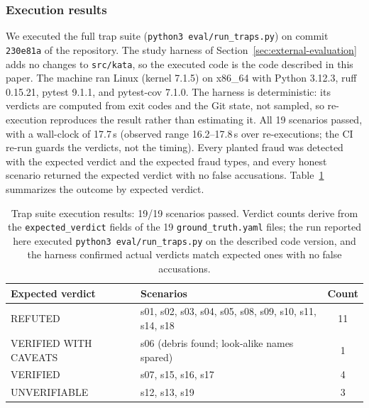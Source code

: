 \documentclass[11pt]{article}
\begin{document}
\subsubsection{Execution results}

We executed the full trap suite (\texttt{python3 eval/run\_traps.py}) on
commit \texttt{230e81a} of the repository. The study harness of
Section~\ref{sec:external-evaluation} adds no changes to \texttt{src/kata},
so the executed code is the code described in this paper. The machine ran
Linux (kernel 7.1.5) on x86\_64 with Python 3.12.3, ruff 0.15.21, pytest 9.1.1, and
pytest-cov 7.1.0. The harness is deterministic: its verdicts are computed
from exit codes and the Git state, not sampled, so re-execution reproduces
the result rather than estimating it. All 19 scenarios passed, with a
wall-clock of 17.7\,s (observed range 16.2--17.8\,s over re-executions; the CI re-run
guards the verdicts, not the timing). Every planted fraud was detected
with the expected verdict and the expected fraud types, and every honest
scenario returned the expected verdict with no false accusations.
Table~\ref{tab:results} summarizes the outcome by expected verdict.

\begin{table}[!ht]
\caption{Trap suite execution results: 19/19 scenarios passed.
Verdict counts derive from the \texttt{expected\_verdict} fields of the 19
\texttt{ground\_truth.yaml} files; the run reported here executed
\texttt{python3 eval/run\_traps.py} on the described code version, and the
harness confirmed actual verdicts match expected ones with no false
accusations.}
\centering
\footnotesize
\begin{tabular}{@{}lp{6.5cm}c@{}}
\toprule
Expected verdict & Scenarios & Count \\
\midrule
REFUTED & s01, s02, s03, s04, s05, s08, s09, s10, s11, s14, s18 & 11 \\
VERIFIED WITH CAVEATS & s06 (debris found; look-alike names spared) & 1 \\
VERIFIED & s07, s15, s16, s17 & 4 \\
UNVERIFIABLE & s12, s13, s19 & 3 \\
\bottomrule
\end{tabular}
\label{tab:results}
\end{table}
\end{document}
